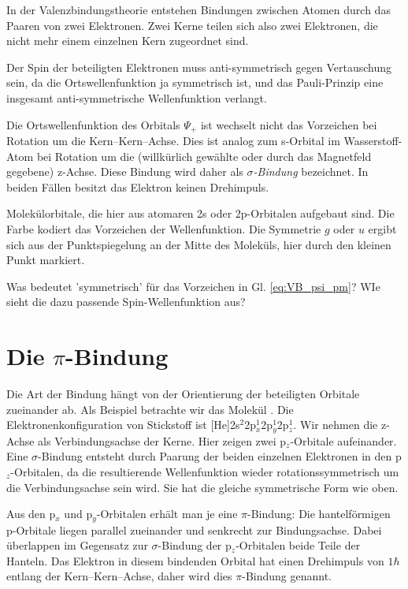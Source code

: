 In der Valenzbindungstheorie entstehen Bindungen zwischen Atomen durch das 
Paaren von zwei Elektronen. Zwei Kerne teilen sich also zwei Elektronen, die nicht mehr einem einzelnen Kern zugeordnet sind.

Der Spin der beteiligten Elektronen muss anti-symmetrisch gegen Vertauschung sein, da die Ortswellenfunktion ja symmetrisch ist, und das Pauli-Prinzip eine insgesamt anti-symmetrische Wellenfunktion  verlangt.

Die Ortswellenfunktion des Orbitals $\Psi_{+}$ ist wechselt nicht das Vorzeichen bei Rotation um die Kern--Kern--Achse. Dies ist analog zum s-Orbital im Wasserstoff-Atom bei Rotation um die (willkürlich gewählte oder durch das Magnetfeld gegebene) z-Achse.  Diese Bindung wird daher als \emph{$\sigma$-Bindung} bezeichnet. In beiden Fällen besitzt das Elektron keinen Drehimpuls.


\begin{marginfigure}
\caption{Molekülorbitale, die hier aus atomaren 2s oder 2p-Orbitalen aufgebaut sind. Die Farbe kodiert das Vorzeichen der Wellenfunktion. Die Symmetrie $g$ oder $u$ ergibt sich aus der Punktspiegelung an der Mitte des Moleküls, hier durch den kleinen Punkt markiert. \label{fig:VB_AO_zu_MO}}
\end{marginfigure}


\begin{questions} 
\item Was bedeutet 'symmetrisch' für das Vorzeichen in Gl. \ref{eq:VB_psi_pm}? WIe sieht die dazu passende Spin-Wellenfunktion aus?
\end{questions}


\section{Die $\pi$-Bindung}

Die Art der Bindung hängt von der Orientierung der beteiligten Orbitale zueinander ab. Als Beispiel betrachte wir das Molekül . Die Elektronenkonfiguration von Stickstoff ist [He]2s$^2$2p$_x^1$2p$_y^1$2p$_z^1$. Wir nehmen die z-Achse als Verbindungsachse der Kerne. Hier zeigen zwei p$_z$-Orbitale aufeinander. Eine $\sigma$-Bindung entsteht durch Paarung der beiden einzelnen Elektronen in den  p$_z$-Orbitalen, da die resultierende Wellenfunktion wieder rotationssymmetrisch um die Verbindungsachse sein wird. Sie hat die gleiche symmetrische Form wie oben.

Aus den p$_x$ und p$_y$-Orbitalen erhält man je eine $\pi$-Bindung: Die hantelförmigen p-Orbitale liegen parallel zueinander und senkrecht zur Bindungsachse. Dabei überlappen im Gegensatz zur $\sigma$-Bindung der p$_z$-Orbitalen beide Teile der Hanteln. Das Elektron in diesem bindenden Orbital hat einen Dreh\-impuls von $1 \hbar$ entlang der Kern--Kern--Achse, daher wird dies $\pi$-Bindung genannt.

